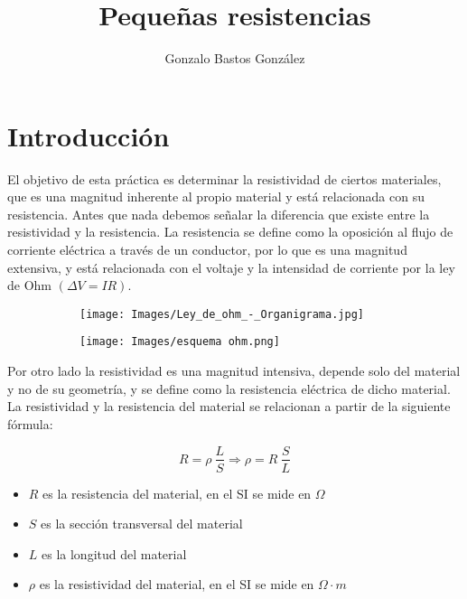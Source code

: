 \documentclass[a4paper,12pt,titlepage]{article}
\title{Pequeñas resistencias}
\author{Gonzalo Bastos González}
\begin{document}
\maketitle

\tableofcontents
\newpage

\section{Introducción}

El objetivo de esta práctica es determinar la resistividad de ciertos materiales, que es una magnitud inherente al propio material y está relacionada con su resistencia. Antes que nada debemos señalar la diferencia que existe entre la resistividad y la resistencia. La resistencia se define como la oposición al flujo de corriente eléctrica a través de un conductor, por lo que es una magnitud extensiva, y está relacionada con el voltaje y la intensidad de corriente por la ley de Ohm $(\Delta V = IR)$.

\begin{figure}[h!]
    \begin{subfigure}{0.5\textwidth}
        \centering
        \texttt{[image: Images/Ley\_de\_ohm\_-\_Organigrama.jpg]}
    \end{subfigure}
    \begin{subfigure}{0.42\textwidth}
        \centering
        \texttt{[image: Images/esquema ohm.png]}
    \end{subfigure}
\end{figure}

Por otro lado la resistividad es una magnitud intensiva, depende solo del material y no de su geometría, y se define como la resistencia eléctrica de dicho material. La resistividad y la resistencia del material se relacionan a partir de la siguiente fórmula:

\begin{equation}
    R = \rho \: \frac{L}{S} \Rightarrow \rho = R \: \frac{S}{L}
    \label{Resistividad}
\end{equation}

\begin{itemize}
    \item $R$ es la resistencia del material, en el SI se mide en $\Omega$
    \item $S$ es la sección transversal del material
    \item $L$ es la longitud del material
    \item $\rho$ es la resistividad del material, en el SI se mide en $\Omega \cdot m$
\end{itemize}
\end{document}

